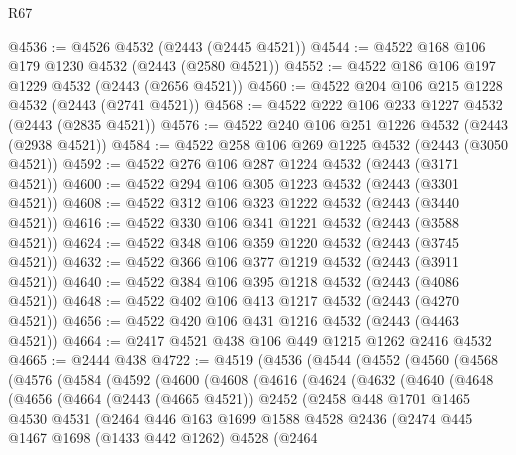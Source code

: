 \begin{lexlean}{R67}
\begin{coremodule}
@4536 := @4526 @4532 (@2443 (@2445 @4521))
@4544 := @4522 @168 @106 @179 @1230 @4532 (@2443 (@2580 @4521))
@4552 := @4522 @186 @106 @197 @1229 @4532 (@2443 (@2656 @4521))
@4560 := @4522 @204 @106 @215 @1228 @4532 (@2443 (@2741 @4521))
@4568 := @4522 @222 @106 @233 @1227 @4532 (@2443 (@2835 @4521))
@4576 := @4522 @240 @106 @251 @1226 @4532 (@2443 (@2938 @4521))
@4584 := @4522 @258 @106 @269 @1225 @4532 (@2443 (@3050 @4521))
@4592 := @4522 @276 @106 @287 @1224 @4532 (@2443 (@3171 @4521))
@4600 := @4522 @294 @106 @305 @1223 @4532 (@2443 (@3301 @4521))
@4608 := @4522 @312 @106 @323 @1222 @4532 (@2443 (@3440 @4521))
@4616 := @4522 @330 @106 @341 @1221 @4532 (@2443 (@3588 @4521))
@4624 := @4522 @348 @106 @359 @1220 @4532 (@2443 (@3745 @4521))
@4632 := @4522 @366 @106 @377 @1219 @4532 (@2443 (@3911 @4521))
@4640 := @4522 @384 @106 @395 @1218 @4532 (@2443 (@4086 @4521))
@4648 := @4522 @402 @106 @413 @1217 @4532 (@2443 (@4270 @4521))
@4656 := @4522 @420 @106 @431 @1216 @4532 (@2443 (@4463 @4521))
@4664 := @2417 @4521 @438 @106 @449 @1215 @1262 @2416 @4532
@4665 := @2444 @438
@4722 := @4519
    (@4536
      (@4544
        (@4552
          (@4560
            (@4568
              (@4576
                (@4584
                  (@4592
                    (@4600
                      (@4608
                        (@4616
                          (@4624
                            (@4632
                              (@4640
                                (@4648
                                  (@4656
                                    (@4664
                                      (@2443 (@4665 @4521))
                                      @2452
                                      (@2458
                                        @448
                                        @1701
                                        @1465
                                        @4530
                                        @4531
                                        (@2464
                                          @446
                                          @163
                                          @1699
                                          @1588
                                          @4528
                                          @2436
                                          (@2474
                                            @445
                                            @1467
                                            @1698
                                            (@1433 @442 @1262)
                                            @4528
                                            (@2464

\end{coremodule}
\end{lexlean}
